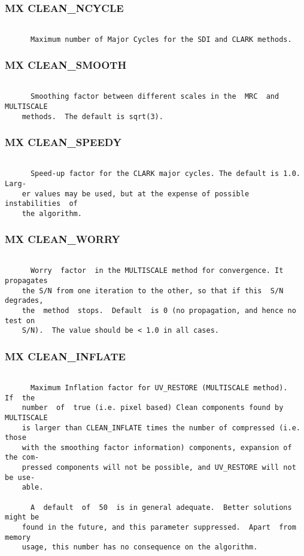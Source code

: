 \subsubsection{MX CLEAN\_NCYCLE}
\begin{verbatim}

      Maximum number of Major Cycles for the SDI and CLARK methods.

\end{verbatim}
\subsubsection{MX CLEAN\_SMOOTH}
\begin{verbatim}

      Smoothing factor between different scales in the  MRC  and  MULTISCALE
    methods.  The default is sqrt(3).

\end{verbatim}
\subsubsection{MX CLEAN\_SPEEDY}
\begin{verbatim}

      Speed-up factor for the CLARK major cycles. The default is 1.0.  Larg-
    er values may be used, but at the expense of possible  instabilities  of
    the algorithm.

\end{verbatim}
\subsubsection{MX CLEAN\_WORRY}
\begin{verbatim}

      Worry  factor  in the MULTISCALE method for convergence. It propagates
    the S/N from one iteration to the other, so that if this  S/N  degrades,
    the  method  stops.  Default  is 0 (no propagation, and hence no test on
    S/N).  The value should be < 1.0 in all cases.

\end{verbatim}
\subsubsection{MX CLEAN\_INFLATE}
\begin{verbatim}

      Maximum Inflation factor for UV_RESTORE (MULTISCALE method).   If  the
    number  of  true (i.e. pixel based) Clean components found by MULTISCALE
    is larger than CLEAN_INFLATE times the number of compressed (i.e.  those
    with the smoothing factor information) components, expansion of the com-
    pressed components will not be possible, and UV_RESTORE will not be use-
    able.

      A  default  of  50  is in general adequate.  Better solutions might be
    found in the future, and this parameter suppressed.  Apart  from  memory
    usage, this number has no consequence on the algorithm.

\end{verbatim}
